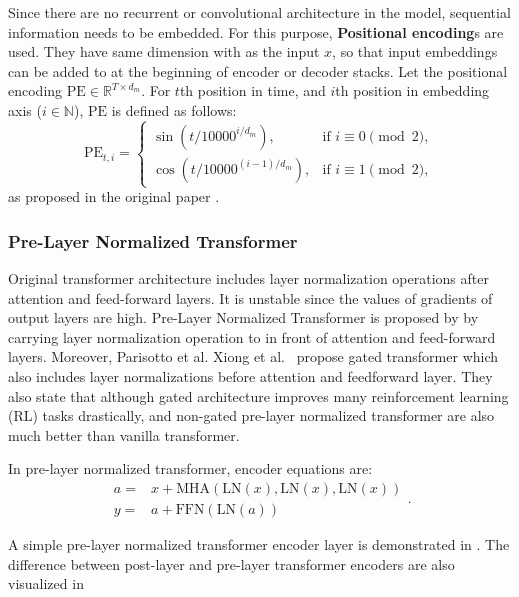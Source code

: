 Since there are no recurrent or convolutional architecture in the model, sequential information needs to be embedded. 
For this purpose, \textbf{Positional encoding}s are used. 
They have same dimension with as the input $x$, so that input embeddings can be added to at the beginning of encoder or decoder stacks. 
Let the positional encoding $\mathrm{PE} \in \mathbb{R}^{T \times d_m}$.
For $t$th position in time, and $i$th position in embedding axis ($i \in \mathbb{N}$), $\mathrm{PE}$ is defined as follows: 
\begin{equation}
\mathrm{PE}_{t,i} = 
\begin{cases}
\sin(t/10000^{i/d_m}),   & \text{if } i \equiv 0 \pmod 2 ,\\
\cos(t/10000^{(i-1)/d_m}),   & \text{if } i \equiv 1 \pmod 2 ,
\end{cases}
\end{equation}
as proposed in the original paper \cite{vaswani_attention_2017}. 

\subsubsection{Pre-Layer Normalized Transformer}

Original transformer architecture includes layer normalization operations after attention and feed-forward layers. 
It is unstable since the values of gradients of output layers are high. 
Pre-Layer Normalized Transformer is proposed by \cite{xiong_layer_2020} by carrying layer normalization operation to in front of attention and feed-forward layers. 
Moreover, Parisotto et al. Xiong et al.~ \cite{parisotto_stabilizing_2019} propose gated transformer which also includes layer normalizations before attention and feedforward layer. 
They also state that although gated architecture improves many reinforcement learning (RL) tasks drastically, and non-gated pre-layer normalized transformer are also much better than vanilla transformer. 

In pre-layer normalized transformer, encoder equations are: 
\begin{equation}
\begin{split}
a = & x+ \mathrm{MHA}(\mathrm{LN}(x),\mathrm{LN}(x),\mathrm{LN}(x)) \\
y = & a + \mathrm{FFN}(\mathrm{LN}(a))
\end{split}.
\end{equation}

A simple pre-layer normalized transformer encoder layer is demonstrated in . 
The difference between post-layer and pre-layer transformer encoders are also visualized in 

